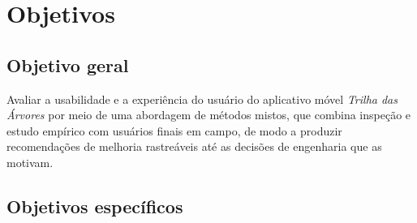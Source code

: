 \section{Objetivos}
\label{sec:objetivos}

\subsection{Objetivo geral}

Avaliar a usabilidade e a experiência do usuário do aplicativo móvel
\textit{Trilha das Árvores} por meio de uma abordagem de métodos mistos, que
combina inspeção e estudo empírico com usuários finais em campo,
de modo a produzir recomendações de melhoria rastreáveis até as decisões de
engenharia que as motivam.

\subsection{Objetivos específicos}

